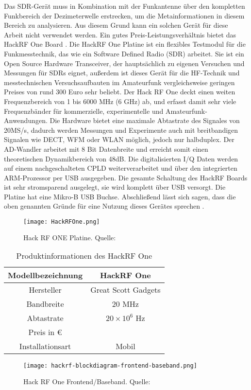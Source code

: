 Das SDR-Gerät muss in Kombination mit der Funkantenne über den kompletten Funkbereich der Dezimeterwelle erstrecken, um die Metainformationen in diesem Bereich zu analysieren. Aus diesem Grund kann ein solchen Gerät für diese Arbeit nicht verwendet werden.
Ein gutes Preis-Leistungsverhältnis bietet das HackRF One Board \cite{greatscott}. Die HackRF One Platine ist ein flexibles Testmodul für die Funkmesstechnik, das wie ein Software Defined Radio (SDR) arbeitet. Sie ist ein Open Source Hardware Transceiver, der hauptsächlich zu eigenen Versuchen und Messungen für SDRs eignet, außerdem ist dieses Gerät für die HF-Technik und messtechnischen Versuchsaufbauten im Amateurfunk vergleichsweise geringen Preises von rund 300 Euro sehr beliebt.
Der Hack RF One deckt einen weiten Frequenzbereich von 1 bis 6000 MHz (6 GHz) ab, und erfasst damit sehr viele Frequenzbänder für kommerzielle, experimentelle und Amateurfunk-Anwendungen. Die Hardware bietet eine maximale Abtastrate des Signales von 20MS/s, dadurch werden Messungen und Experimente auch mit breitbandigen Signalen wie DECT, WFM oder WLAN möglich, jedoch nur halbduplex. Der AD-Wandler arbeitet mit 8 Bit Datenbreite und erreicht somit einen theoretischen Dynamikbereich von 48dB. Die digitalisierten I/Q Daten werden auf einem nachgeschalteten CPLD weiterverarbeitet und über den integrierten ARM-Prozessor per USB ausgegeben. Die gesamte Schaltung des HackRF Boards ist sehr stromsparend ausgelegt, sie wird komplett über USB versorgt. Die Platine hat eine Mikro-B USB Buchse. Abschließend lässt sich sagen, dass die oben genannten Gründe für eine Nutzung dieses Gerätes sprechen \cite{wimo:2018}.


\begin{figure}[ht]
	\centering
	\texttt{[image: HackRFOne.png]}
	\caption[Hack RF ONE Platine]{Hack RF ONE Platine. Quelle: \cite{HackRFOne:2018}} 
	\label{HackRFOne}
\end{figure}


\begin{table}[ht]
	\centering
	\begin{tabular}{c|c}
		Modellbezeichnung & HackRF One \\
		\hline
		Hersteller & Great Scott Gadgets\\ 
		\hline 
		Bandbreite & 20 MHz \\ 
		\hline 
		Abtastrate & \( 20 \times 10^{6} \) Hz \\ 
		\hline 
		Preis in \euro &  \\ 
		\hline 
		Installationsart & Mobil \\ 
		
	\end{tabular} 
	\caption{Produktinformationen des HackRF One}
\end{table}


\begin{figure}[ht]
	\centering
	\texttt{[image: hackrf-blockdiagram-frontend-baseband.png]}
	\caption[Hack RF One Frontend/Baseband]{Hack RF One Frontend/Baseband. Quelle: \cite{hackrf-wiki:2016}} 
	\label{HackRFOne-Blockschaltbild}
\end{figure}
